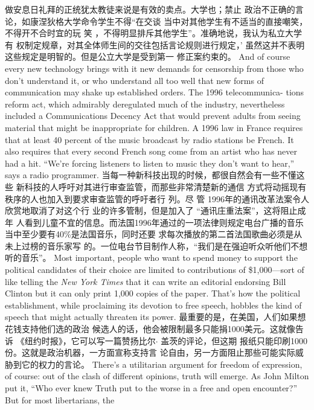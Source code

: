 \begin{paracol}{2}
做安息日礼拜的正统犹太教徒来说是有效的卖点。大学也；禁止
政治不正确的言论，如康涅狄格大学命令学生不得“在交谈
当中对其他学生有不适当的直接嘲笑，不得开不合时宜的玩
笑 ，不得明显排斥其他学生”。准确地说，我认为私立大学有
权制定规章，对其全体师生间的交往包括言论规则进行规定，’
虽然这并不表明这些规定是明智的。但是公立大学是受到第一
修正案约束的。
\switchcolumn*
And of course every new technology brings with it new demands for censorship from those who don't understand it, or
who understand all too well that new forms of communication
may shake up established orders. The 1996 telecommunica-
tions reform act, which admirably deregulated much of the industry, nevertheless included a Communications Decency Act
that would prevent adults from seeing material that might be
inappropriate for children. A 1996 law in France requires that
at least 40 percent of the music broadcast by radio stations be
French. It also requires that every second French song come
from an artist who has never had a hit. ``We're forcing listeners to listen to music they don't want to hear,'' says a radio programmer.
\switchcolumn
当每一种新科技出现的时候，都很自然会有一些不懂这些
新科技的人呼吁对其进行审查监管，而那些非常清楚新的通信
方式将动摇现有秩序的人也加入到要求审查监管的呼吁者行
列。尽 管 1996年的通讯改革法案令人欣赏地取消了对这个行
业的许多管制，但是加入了 “通讯庄重法案”，这将阻止成年
人看到儿童不宜的信息。而法国1996年通过的一项法律则规定电台广播的音乐当中至少要有40\%是法国音乐，同时还要
求每次播放的第二首法国歌曲必须是从未上过榜的音乐家写
的。一位电台节目制作人称，“我们是在强迫听众听他们不想
听的音乐”。
\switchcolumn*
Most important, people who want to spend money to support the political candidates of their choice are limited to contributions of \$1,000---sort of like telling the \textit{New York Times}
that it can write an editorial endorsing Bill Clinton but it can
only print 1,000 copies of the paper. That's how the political establishment, while proclaiming its devotion to free speech, hobbles the kind of speech that might actually threaten its power.
\switchcolumn
最重要的是，在美国，人们如果想花钱支持他们选的政治
候选人的话，他会被限制最多只能捐1000美元。这就像告诉
《纽约时报》，它可以写一篇赞扬比尔$\cdot$ 盖茨的评论，但这期
报纸只能印刷1000份。这就是政治机器，一方面宣称支持言
论自由，另一方面阻止那些可能实际威胁到它的权力的言论。
\switchcolumn*
There's a utilitarian argument for freedom of expression, of
course: out of the clash of different opinions, truth will emerge.
As John Milton put it, ``Who ever knew Truth put to the worse
in a free and open encounter?'' But for most libertarians, the

\end{paracol}

